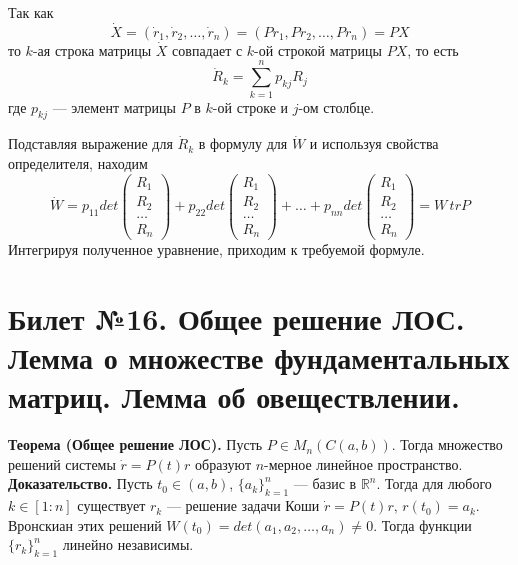 \documentclass{article}
\begin{document}
Так как
\begin{equation*}
    \dot{X} = (\dot{r}_1, \dot{r}_2, \ldots, \dot{r}_n) = (Pr_1, Pr_2, \ldots, Pr_n) = PX
\end{equation*}
то $k$-ая строка матрицы $\dot{X}$ совпадает с $k$-ой строкой матрицы $PX$, то есть
\begin{equation*}
    \dot{R}_k = \sum_{k=1}^n p_{kj}R_j
\end{equation*}
где $p_{kj}$ --- элемент матрицы $P$ в $k$-ой строке и $j$-ом столбце.

Подставляя выражение для $\dot{R}_k$ в формулу для $\dot{W}$ и используя свойства определителя, находим
\begin{equation*}
    \dot{W} = p_{11}det\begin{pmatrix}
    R_1\\
    R_2\\
    \ldots\\
    R_n
    \end{pmatrix} + p_{22}det\begin{pmatrix}
    R_1\\
    R_2\\
    \ldots\\
    R_n
    \end{pmatrix} + \ldots + p_{nn}det\begin{pmatrix}
    R_1\\
    R_2\\
    \ldots\\
    R_n
    \end{pmatrix} = W\,trP
\end{equation*}
Интегрируя полученное уравнение, приходим к требуемой формуле.

\section{Билет №16. Общее решение ЛОС. Лемма о множестве фундаментальных матриц. Лемма об овеществлении.}
\textbf{Теорема (Общее решение ЛОС).} Пусть $P \in M_n(C(a,b))$. Тогда множество решений системы $\dot{r} = P(t)r$ образуют $n$-мерное линейное пространство.\\

\noindent \textbf{Доказательство.} Пусть $t_0 \in (a,b)$, $\{a_k\}_{k=1}^n$ --- базис в $\mathbb{R}^n$. Тогда для любого $k \in [1 : n]$ существует $r_k$ --- решение задачи Коши $\dot{r} = P(t)r,\, r(t_0) = a_k$. Вронскиан этих решений $W(t_0) = det(a_1, a_2, \ldots, a_n) \neq 0$. Тогда функции $\{r_k\}_{k=1}^n$ линейно независимы.
\end{document}
